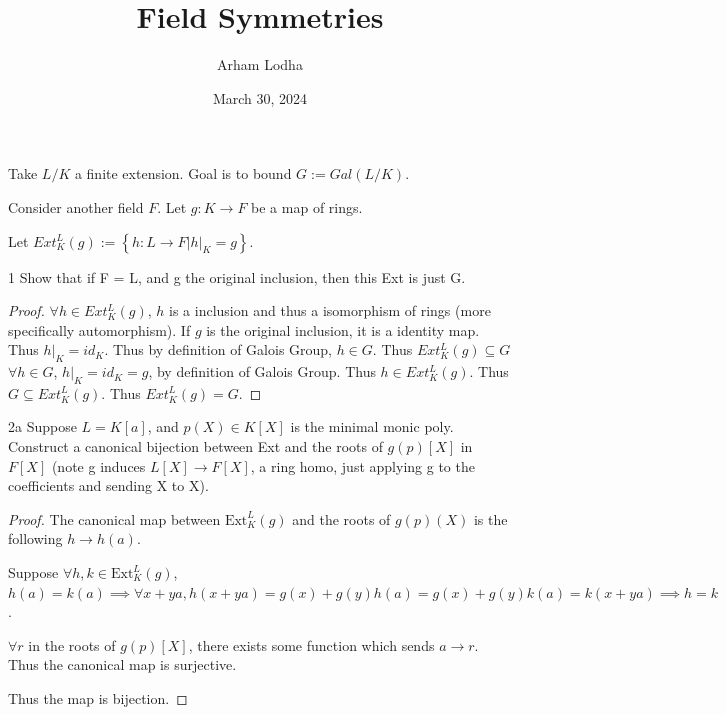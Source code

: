 \documentclass{article}
\newcommand{\ext}[2]{\text{Ext}_{#1}^{#2}}
\begin{document}
\title{Field Symmetries}
\author{Arham Lodha}%
\date{March 30, 2024}%
\maketitle

Take $L / K$ a finite extension. Goal is to bound $G := Gal(L / K)$.   

Consider another field $F$. Let $g: K \to F$ be a map of rings. 

Let $Ext_K^L(g) := \left\{ h: L \to F | h|_K = g \right\}$.  
\begin{PROB}{1}\label{Problem 1.}
    Show that if F = L, and g the original inclusion, then this Ext is just G. 
\end{PROB}
\begin{proof}
    $\forall h \in Ext_K^L(g)$, $h$ is a inclusion and thus a isomorphism of rings (more specifically automorphism). If $g$ is the original inclusion, it is a identity map. Thus $h|_K = id_K$. Thus by definition of Galois Group, $h \in G$. Thus $Ext_K^L(g) \subseteq G$ 
    $\forall h \in G$, $h|_K = id_K = g$, by definition of Galois Group. Thus $h \in Ext_K^L(g)$. Thus $G \subseteq Ext_K^L(g)$.
    Thus $Ext_K^L(g) = G$. 
\end{proof}

\bigskip

\begin{PROB}{2a}\label{Problem 2a.}
    Suppose $L = K[a]$, and $p(X) \in K[X]$ is the minimal monic poly. Construct a canonical bijection between Ext and the roots of $g(p)[X]$ in $F[X]$  (note g induces $L[X] \to F[X]$, a ring homo, just applying g to the coefficients and sending X to X).
\end{PROB}
\begin{proof}
    The canonical map between $\ext{K}{L}(g)$ and the roots of $g(p)(X)$ is the following $h \to h(a)$.

    Suppose $\forall h, k \in \ext{K}{L}(g)$, $h(a) = k(a) \implies \forall x + ya, h(x + ya) = g(x) + g(y)h(a) = g(x) + g(y)k(a) = k(x+ ya) \implies h = k$.
    
    $\forall r$ in the roots of $g(p)[X]$, there exists some function which sends $a \to r$. Thus the canonical map is surjective.
    
    Thus the map is bijection.  
\end{proof}
\end{document}
